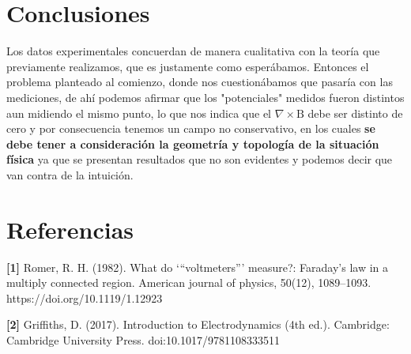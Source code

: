\documentclass[a0,portrait]{a0poster}
\begin{document}
\begin{multicols}{2}

\color{Black} %

\section*{Conclusiones}

\noindent Los datos experimentales concuerdan de manera cualitativa con la teoría que previamente realizamos, que es justamente como esperábamos. Entonces el problema planteado al comienzo, donde nos cuestionábamos que pasaría con las mediciones, de ahí podemos afirmar que los "potenciales" medidos  fueron distintos aun midiendo el mismo punto, lo que nos indica que el  $\nabla \times \text{B}$ debe ser distinto de cero y por consecuencia tenemos un campo no conservativo, en los cuales  \textbf{ se debe tener a consideración la geometría y topología de la situación física} ya que se presentan resultados que no son evidentes y podemos decir que van contra de la intuición.

\color{Black} %



\section*{Referencias}

\textbf{[1]}
Romer, R. H. (1982). What do ‘“voltmeters”’ measure?: Faraday’s law in a multiply connected region. American journal of physics, 50(12), 1089–1093. https://doi.org/10.1119/1.12923
\vspace{0.4cm}

\textbf{[2]} Griffiths, D. (2017). Introduction to Electrodynamics (4th ed.). Cambridge: Cambridge University Press. doi:10.1017/9781108333511



\end{multicols}
\end{document}
